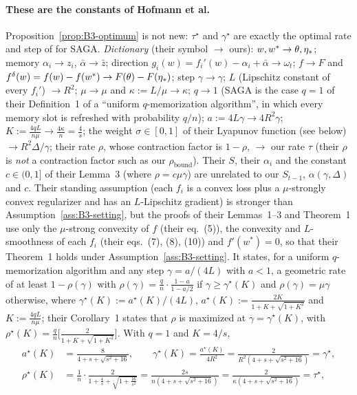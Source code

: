 \paragraph{These are the constants of Hofmann et al.}
Proposition~\ref{prop:B3-optimum} is not new: $\tau^\star$ and $\gamma^\star$ are exactly the optimal rate and step of \cite[Theorem~1 and Corollary~1]{hofmann2015variance} for SAGA. \emph{Dictionary} (their symbol $\to$ ours): $w,w^\ast\to\theta,\eta_\ast$; memory $\alpha_i\to z_i$, $\bar\alpha\to\bar z$; direction $g_i(w)=f_i'(w)-\alpha_i+\bar\alpha\to\omega_t$; $f\to F$ and $f^\delta(w)=f(w)-f(w^\ast)\to F(\theta)-F(\eta_\ast)$; step $\gamma\to\gamma$; $L$ (Lipschitz constant of every $f_i'$) $\to R^2$; $\mu\to\mu$ and $\kappa:=L/\mu\to\kappa$; $q\to1$ (SAGA is the case $q=1$ of their Definition~1 of a ``uniform $q$-memorization algorithm'', in which every memory slot is refreshed with probability $q/n$); $a:=4L\gamma\to4R^2\gamma$; $K:=\frac{4qL}{n\mu}\to\frac{4\kappa}n=\frac4s$; the weight $\sigma\in[0,1]$ of their Lyapunov function (see below) $\to R^2\Delta/\gamma$; their rate $\rho$, whose contraction factor is $1-\rho$, $\to$ our rate $\tau$ (their $\rho$ is \emph{not} a contraction factor such as our $\rho_{\mathrm{bound}}$). Their $S$, their $\alpha_i$ and the constant $c\in(0,1]$ of their Lemma~3 (where $\rho=c\mu\gamma$) are unrelated to our $S_{t-1}$, $\alpha(\gamma,\Delta)$ and $c$. Their standing assumption (each $f_i$ is a convex loss plus a $\mu$-strongly convex regularizer and has an $L$-Lipschitz gradient) is stronger than Assumption~\ref{ass:B3-setting}, but the proofs of their Lemmas~1--3 and Theorem~1 use only the $\mu$-strong convexity of $f$ (their eq.~(5)), the convexity and $L$-smoothness of each $f_i$ (their eqs.~(7), (8), (10)) and $f'(w^\ast)=0$, so that their Theorem~1 holds under Assumption~\ref{ass:B3-setting}. It states, for a uniform $q$-memorization algorithm and any step $\gamma=a/(4L)$ with $a<1$, a geometric rate of at least $1-\rho(\gamma)$ with $\rho(\gamma)=\frac qn\cdot\frac{1-a}{1-a/2}$ if $\gamma\ge\gamma^\star(K)$ and $\rho(\gamma)=\mu\gamma$ otherwise, where $\gamma^\star(K):=a^\star(K)/(4L)$, $a^\star(K):=\frac{2K}{1+K+\sqrt{1+K^2}}$ and $K:=\frac{4qL}{n\mu}$; their Corollary~1 states that $\rho$ is maximized at $\gamma=\gamma^\star(K)$, with $\rho^\star(K)=\frac qn\big[\frac{2}{1+K+\sqrt{1+K^2}}\big]$. With $q=1$ and $K=4/s$,
\begin{align*}
a^\star(K)&=\frac{8}{4+s+\sqrt{s^2+16}},\qquad
\gamma^\star(K)=\frac{a^\star(K)}{4R^2}=\frac{2}{R^2(4+s+\sqrt{s^2+16})}=\gamma^\star,\\
\rho^\star(K)&=\frac1n\cdot\frac{2}{1+\frac4s+\sqrt{1+\frac{16}{s^2}}}=\frac{2s}{n(4+s+\sqrt{s^2+16})}=\frac{2}{\kappa(4+s+\sqrt{s^2+16})}=\tau^\star ,
\end{align*}
